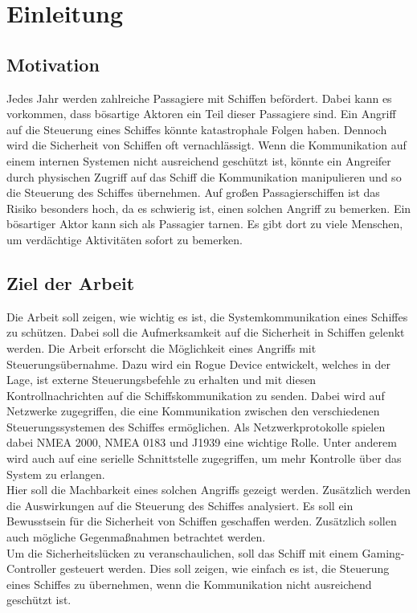 \chapter{Einleitung}

\section{Motivation}
Jedes Jahr werden zahlreiche Passagiere mit Schiffen befördert. Dabei kann es vorkommen, dass bösartige Aktoren ein Teil dieser Passagiere sind.
Ein Angriff auf die Steuerung eines Schiffes könnte katastrophale Folgen haben. Dennoch wird die Sicherheit von Schiffen oft vernachlässigt.
Wenn die Kommunikation auf einem internen Systemen nicht ausreichend geschützt ist, könnte ein Angreifer durch physischen Zugriff auf das Schiff die 
Kommunikation manipulieren und so die Steuerung des Schiffes übernehmen. Auf großen Passagierschiffen ist das Risiko besonders hoch, da es
schwierig ist, einen solchen Angriff zu bemerken. Ein bösartiger Aktor kann sich als Passagier tarnen. Es gibt dort
zu viele Menschen, um verdächtige Aktivitäten sofort zu bemerken. \\

\section{Ziel der Arbeit}
Die Arbeit soll zeigen, wie wichtig es ist, die Systemkommunikation eines Schiffes zu schützen.
Dabei soll die Aufmerksamkeit auf die Sicherheit in Schiffen gelenkt werden.
Die Arbeit erforscht die Möglichkeit eines Angriffs mit Steuerungsübernahme. Dazu wird ein Rogue Device entwickelt, 
welches in der 
Lage, ist externe Steuerungsbefehle zu erhalten und mit diesen Kontrollnachrichten auf die Schiffskommunikation zu senden.
Dabei wird auf Netzwerke zugegriffen, die eine Kommunikation zwischen den verschiedenen Steuerungssystemen des Schiffes 
ermöglichen. Als Netzwerkprotokolle spielen dabei NMEA 2000, NMEA 0183 und J1939 eine wichtige Rolle. Unter anderem wird auch 
auf eine serielle Schnittstelle zugegriffen, um mehr Kontrolle über das System zu erlangen. \\
Hier soll die Machbarkeit eines solchen Angriffs gezeigt werden. Zusätzlich werden die Auswirkungen auf die Steuerung des 
Schiffes analysiert. Es soll ein Bewusstsein für die Sicherheit von Schiffen geschaffen werden. Zusätzlich 
sollen auch mögliche Gegenmaßnahmen betrachtet werden. \\
Um die Sicherheitslücken zu veranschaulichen, soll das Schiff mit einem Gaming-Controller gesteuert werden.
Dies soll zeigen, wie einfach es ist, die Steuerung eines Schiffes zu übernehmen, wenn die Kommunikation nicht 
ausreichend geschützt ist.\\
